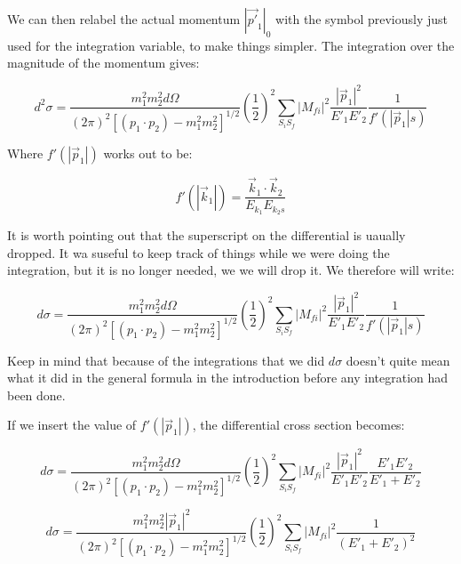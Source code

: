 \documentclass[a4]{article}
\begin{document}
    We can then relabel the actual momentum $|\vec{p'}_1|_0$ with the symbol previously just used for the integration variable, to make things simpler. The integration over the magnitude of the momentum gives: 

    \begin{equation}
        d^2 \sigma = \frac{m_1^2 m_2^2 d \Omega}{(2 \pi)^2 [(p_1 \cdot p_2) - m_1^2 m_2^2]^{1/2}} (\frac{1}{2})^2 \sum_{S_i S_f} |M_{fi}|^2 \frac{|\vec{p}_1|^2}{E'_1 E'_2} \frac{1}{f' (|\vec{p}_1|s)}
    \end{equation}

    Where $f' (|\vec{p}_1|)$ works out to be:

    \begin{equation}
        f' (|\vec{k}_1|) = \frac{\vec{k}_1 \cdot \vec{k}_2}{E_{k_1} E_{k_2s}}
    \end{equation}

    It is worth pointing out that the superscript on the differential is uaually dropped. It wa suseful to keep track of things while we were doing the integration, but it is no longer needed, we we will drop it. 
    We therefore will write: 

    \begin{equation}
        d \sigma = \frac{m_1^2 m_2^2 d \Omega}{(2 \pi)^2 [(p_1 \cdot p_2) - m_1^2 m_2^2]^{1/2}} (\frac{1}{2})^2 \sum_{S_i S_f} |M_{fi}|^2 \frac{|\vec{p}_1|^2}{E'_1 E'_2} \frac{1}{f' (|\vec{p}_1|s)}
    \end{equation}

    Keep in mind that because of the integrations that we did $d \sigma$ doesn't quite mean what it did in the general formula in the introduction before any  integration had been done.

    If we insert the value of $f' (|\vec{p}_1|)$, the differential cross section becomes:

    \begin{equation}
        d \sigma = \frac{m_1^2 m_2^2 d \Omega}{(2 \pi)^2 [(p_1 \cdot p_2) - m_1^2 m_2^2]^{1/2}} (\frac{1}{2})^2 \sum_{S_i S_f} |M_{fi}|^2 \frac{|\vec{p}_1|^2}{E'_1 E'_2} \frac{E'_1 E'_2}{E'_1 + E'_2}
    \end{equation}

    \begin{equation}
        d \sigma = \frac{m_1^2 m_2^2 |\vec{p}_1|^2}{(2 \pi)^2 [(p_1 \cdot p_2) - m_1^2 m_2^2]^{1/2}} (\frac{1}{2})^2 \sum_{S_i S_f} |M_{fi}|^2 \frac{1}{(E'_1 + E'_2)^2}
    \end{equation}
\end{document}
